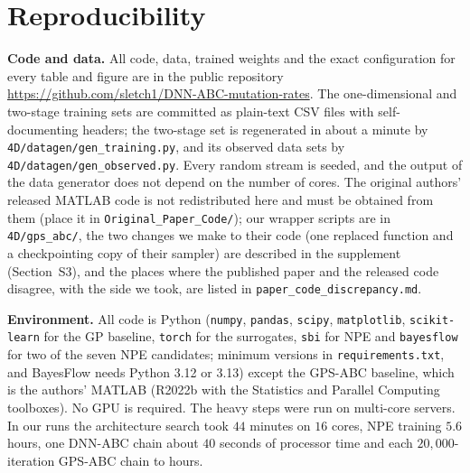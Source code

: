 \documentclass[sn-basic,iicol,pdflatex]{sn-jnl}
\begin{document}
\section{Reproducibility}
\label{sec:repro}

\noindent\textbf{Code and data.} All code, data, trained weights and the exact configuration for every table and figure are in
the public repository \url{https://github.com/sletch1/DNN-ABC-mutation-rates}. The one-dimensional and two-stage training
sets are committed as plain-text CSV files with self-documenting headers; the two-stage set is regenerated in about a minute by
\texttt{4D/datagen/gen\_training.py}, and its observed data sets by \texttt{4D/datagen/gen\_observed.py}. Every random stream is
seeded, and the output of the data generator does not depend on the number of cores. The original authors' released MATLAB code
is not redistributed here and must be obtained from them (place it in \texttt{Original\_Paper\_Code/}); our wrapper scripts are in \texttt{4D/gps\_abc/}, the two changes we make to their code (one replaced function and a checkpointing copy of their sampler) are described in the supplement (Section~S3), and the places where the published paper and the released code
disagree, with the side we took, are listed in \texttt{paper\_code\_discrepancy.md}.

\noindent\textbf{Environment.} All code is Python (\texttt{numpy}, \texttt{pandas}, \texttt{scipy}, \texttt{matplotlib},
\texttt{scikit-learn} for the GP baseline, \texttt{torch} for the surrogates, \texttt{sbi} for NPE and \texttt{bayesflow} for two of the seven NPE candidates; minimum versions in
\texttt{requirements.txt}, and BayesFlow needs Python 3.12 or 3.13) except the GPS-ABC baseline, which is the authors' MATLAB (R2022b with the Statistics and Parallel
Computing toolboxes). No GPU is required. The heavy steps were run on multi-core servers. In our runs the architecture search took $44$ minutes on $16$ cores, NPE training $5.6$ hours, one DNN-ABC chain about $40$ seconds of processor time and each $20{,}000$-iteration GPS-ABC chain \gtrCaseTwoHours{} to \gtrCaseOneHours{} hours.
\end{document}
